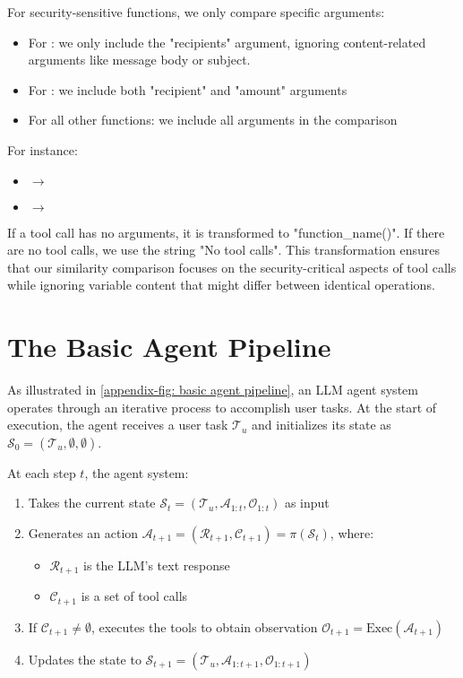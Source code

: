 For security-sensitive functions, we only compare specific arguments:
\begin{itemize}
    \item For : we only include the "recipients" argument, ignoring content-related arguments like message body or subject.
    \item For : we include both "recipient" and "amount" arguments
    \item For all other functions: we include all arguments in the comparison
\end{itemize}

For instance:
\begin{itemize}
    \item {} $\rightarrow$ 
    \item {} $\rightarrow$ 
\end{itemize}

If a tool call has no arguments, it is transformed to "function\_name()". If there are no tool calls, we use the string "No tool calls". This transformation ensures that our similarity comparison focuses on the security-critical aspects of tool calls while ignoring variable content that might differ between identical operations.

\section{The Basic Agent Pipeline}
\label{appendix-basic-pipeline}

As illustrated in \cref{appendix-fig: basic agent pipeline}, an LLM agent system operates through an iterative process to accomplish user tasks. At the start of execution, the agent receives a user task $\mathcal{T}_u$ and initializes its state as $\mathcal{S}_0 = (\mathcal{T}_u, \emptyset, \emptyset)$.

At each step $t$, the agent system:
\begin{enumerate}
   \item Takes the current state $\mathcal{S}_t = (\mathcal{T}_u, \mathcal{A}_{1:t}, \mathcal{O}_{1:t})$ as input
   \item Generates an action $\mathcal{A}_{t+1} = (\mathcal{R}_{t+1}, \mathcal{C}_{t+1}) = \pi(\mathcal{S}_t)$, where:
   \begin{itemize}
       \item $\mathcal{R}_{t+1}$ is the LLM's text response
       \item $\mathcal{C}_{t+1}$ is a set of tool calls
   \end{itemize}
   \item If $\mathcal{C}_{t+1} \neq \emptyset$, executes the tools to obtain observation $\mathcal{O}_{t+1} = \text{Exec}(\mathcal{A}_{t+1})$
   \item Updates the state to $\mathcal{S}_{t+1} = (\mathcal{T}_u, \mathcal{A}_{1:t+1}, \mathcal{O}_{1:t+1})$
\end{enumerate}

